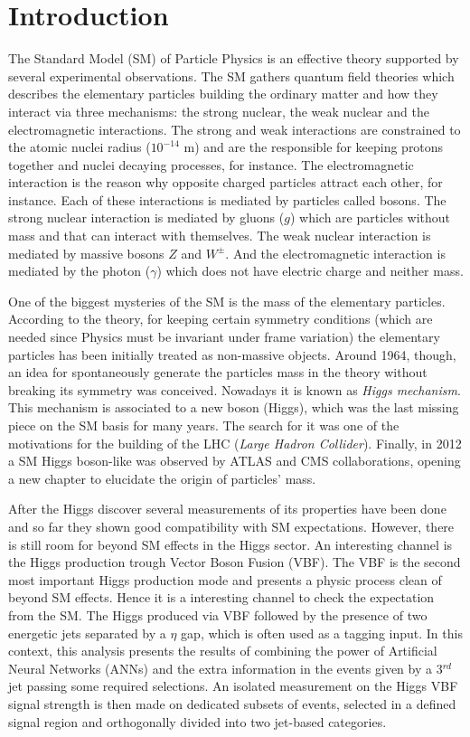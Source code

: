 \chapter{Introduction}
The Standard Model (SM) of Particle Physics is an effective theory supported by several experimental observations. The SM gathers quantum field theories which describes the elementary particles building the ordinary matter and how they interact via three mechanisms: the strong nuclear, the weak nuclear and the electromagnetic interactions. The strong and weak interactions are constrained to the atomic nuclei radius ($10^{-14}$ m) and are the responsible for keeping protons together and nuclei decaying processes, for instance. The electromagnetic interaction is the reason why opposite charged particles attract each other, for instance. Each of these interactions is mediated by particles called bosons. The strong nuclear interaction is mediated by gluons ($g$) which are particles without mass and that can interact with themselves. The weak nuclear interaction is mediated by massive bosons $Z$ and $W^{\pm}$. And the electromagnetic interaction is mediated by the photon ($\gamma$) which does not have electric charge and neither mass.

One of the biggest mysteries of the SM is the mass of the elementary particles. According to the theory, for keeping certain symmetry conditions (which are needed since Physics must be invariant under frame variation) the elementary particles has been initially treated as non-massive objects. Around 1964, though, an idea for spontaneously generate the particles mass in the theory without breaking its symmetry was conceived. Nowadays it is known as \textit{Higgs mechanism}. This mechanism is associated to a new boson (Higgs), which was the last missing piece on the SM basis for many years. The search for it was one of the motivations for the building of the LHC (\textit{Large Hadron Collider}). Finally, in 2012 a SM Higgs boson-like was observed by ATLAS and CMS collaborations, opening a new chapter to elucidate the origin of particles' mass.

After the Higgs discover several measurements of its properties have been done and so far they shown good compatibility with SM expectations. However, there is still room for beyond SM effects in the Higgs sector. An interesting channel is the Higgs production trough Vector Boson Fusion (VBF). The VBF is the second most important Higgs production mode and presents a physic process clean of beyond SM effects. Hence it is a interesting channel to check the expectation from the SM. The Higgs produced via VBF followed by the presence of two energetic jets separated by a $\eta$ gap, which is often used as a tagging input. In this context, this analysis presents the results of combining the power of Artificial Neural Networks (ANNs) and the extra information in the events given by a 3$^{rd}$ jet passing some required selections. An isolated measurement on the Higgs VBF signal strength is then made on dedicated subsets of events, selected in a defined signal region and orthogonally divided into two jet-based categories.